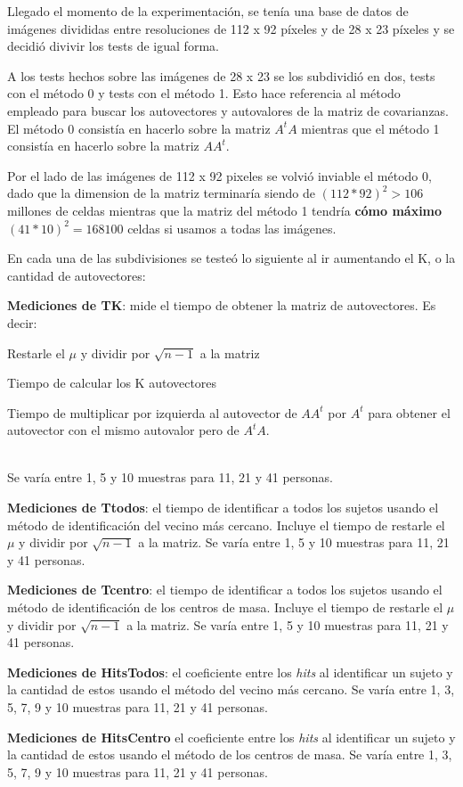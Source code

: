 Llegado el momento de la experimentación, se tenía una base de datos de imágenes divididas entre
resoluciones de 112 x 92 píxeles y de 28 x 23 píxeles y se decidió divivir los tests de igual forma.

A los tests hechos sobre las imágenes de 28 x 23 se los subdividió en dos, tests con el método 0 y
tests con el método 1. Esto hace referencia al método empleado para buscar los autovectores y
autovalores de la matriz de covarianzas. El método 0 consistía en hacerlo sobre la matriz $A^t A$
mientras que el método 1 consistía en hacerlo sobre la matriz $A A^t$.

Por el lado de las imágenes de 112 x 92 pixeles se volvió inviable el método 0, dado que la
dimension de la matriz terminaría siendo de $(112*92)^2 > 106$ millones de celdas mientras que la
matriz del método 1 tendría \textbf{cómo máximo} $(41*10)^2 = 168 100$ celdas si usamos a todas las
imágenes.

En cada una de las subdivisiones se testeó lo siguiente al ir aumentando el K, o la cantidad de
autovectores:
\begin{compactitem}
  \item \textbf{Mediciones de TK}: mide el tiempo de obtener la matriz de autovectores. Es decir:
  \begin{compactenum}
    \item Restarle el $\mu$ y dividir por $\sqrt{n-1}$ a la matriz
    \item Tiempo de calcular los K autovectores
    \item Tiempo de multiplicar por izquierda al autovector de $A A^t$ por $A^t$ para obtener el
    autovector con el mismo autovalor pero de $A^t A$.
  \end{compactenum}
  \ \\ Se varía entre 1, 5 y 10 muestras para 11, 21 y 41 personas.
  \item \textbf{Mediciones de Ttodos}: el tiempo de identificar a todos los sujetos usando el método
  de identificación del vecino más cercano. Incluye el tiempo de restarle el $\mu$ y dividir por
  $\sqrt{n-1}$ a la matriz. Se varía entre 1, 5 y 10 muestras para 11, 21 y 41 personas.
  \item \textbf{Mediciones de Tcentro}: el tiempo de identificar a todos los sujetos usando el método
  de identificación de los centros de masa. Incluye el tiempo de restarle el $\mu$ y dividir por
  $\sqrt{n-1}$ a la matriz. Se varía entre 1, 5 y 10 muestras para 11, 21 y 41 personas.
  \item \textbf{Mediciones de HitsTodos}: el coeficiente entre los \textit{hits} al identificar un
  sujeto y la cantidad de estos usando el método del vecino más cercano. Se varía entre 1, 3, 5, 7,
  9 y 10 muestras para 11, 21 y 41 personas.
  \item \textbf{Mediciones de HitsCentro} el coeficiente entre los \textit{hits} al identificar un
  sujeto y la cantidad de estos usando el método de los centros de masa. Se varía entre 1, 3, 5, 7,
  9 y 10 muestras para 11, 21 y 41 personas.
\end{compactitem}


